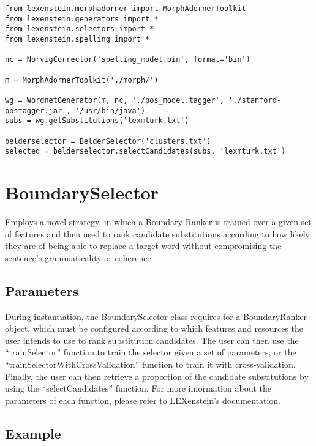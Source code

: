 \begin{lstlisting}
from lexenstein.morphadorner import MorphAdornerToolkit
from lexenstein.generators import *
from lexenstein.selectors import *
from lexenstein.spelling import *

nc = NorvigCorrector('spelling_model.bin', format='bin')

m = MorphAdornerToolkit('./morph/')

wg = WordnetGenerator(m, nc, './pos_model.tagger', './stanford-postagger.jar', '/usr/bin/java')
subs = wg.getSubstitutions('lexmturk.txt')

belderselector = BelderSelector('clusters.txt')
selected = belderselector.selectCandidates(subs, 'lexmturk.txt')
\end{lstlisting}









\section{BoundarySelector}

Employs a novel strategy, in which a Boundary Ranker is trained over a given set of features and then used to rank candidate substitutions according to how likely they are of being able to replace a target word without compromising the sentence's grammaticality or coherence.

\subsection{Parameters}

During instantiation, the BoundarySelector class requires for a BoundaryRanker object, which must be configured according to which features and resources the user intends to use to rank substitution candidates. The user can then use the ``trainSelector'' function to train the selector given a set of parameters, or the ``trainSelectorWithCrossValidation'' function to train it with cross-validation. Finally, the user can then retrieve a proportion of the candidate substitutions by using the ``selectCandidates'' function. For more information about the parameters of each function, please refer to LEXenstein's documentation.

\subsection{Example}


